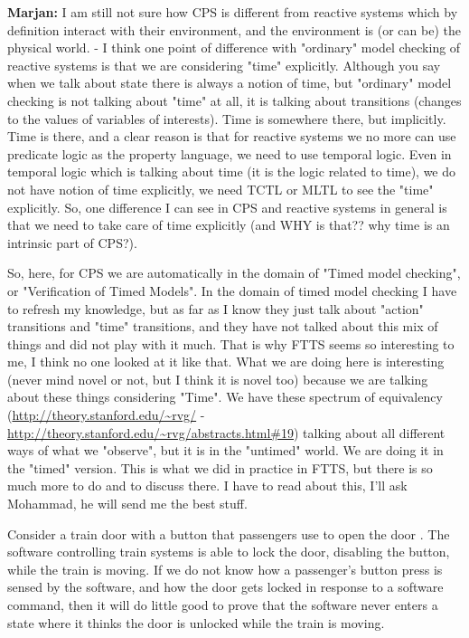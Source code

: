 \documentclass{article}
\newcommand{\MS}[1]{{\color{darkgreen}\textbf{Marjan:} #1}}
\begin{document}
\MS{I am still not sure how CPS is different from reactive systems which by definition interact with their environment, and the environment is (or can be) the physical world. - I think one point of difference with "ordinary" model checking of reactive systems is that we are considering "time" explicitly. Although you say when we talk about state there is always a notion of time, but "ordinary" model checking is not talking about "time" at all, it is talking about transitions (changes to the values of variables of interests). 
Time is somewhere there, but implicitly. Time is there, and a clear reason is that for reactive systems we no more can use predicate logic as the property language, we need to use temporal logic.
Even in temporal logic which is talking about time (it is the logic related to time), we do not have notion of time explicitly, we need TCTL or MLTL to see the "time" explicitly. So, one difference I can see in CPS and reactive systems in general is that we need to take care of time explicitly (and WHY is that?? why time is an intrinsic part of CPS?).

So, here, for CPS we are automatically in the domain of "Timed model checking", or "Verification of Timed Models". In the domain of timed model checking I have to refresh my knowledge, but as far as I know they just talk about "action" transitions and "time" transitions, and they have not talked about this mix of things and did not play with it much. That is why FTTS seems so interesting to me, I think no one looked at it like that. What we are doing here is interesting (never mind novel or not, but I think it is novel too) because we are talking about these things considering "Time". We have these spectrum of equivalency (\url{http://theory.stanford.edu/~rvg/} - \url{http://theory.stanford.edu/~rvg/abstracts.html#19}) talking about all different ways of what we "observe", but it is in the "untimed" world.
We are doing it in the "timed" version. This is what we did in practice in FTTS, but there is so much more to do and to discuss there. I have to read about this, I'll ask Mohammad, he will send me the best stuff.}

Consider a train door with a button that passengers use to open the door \cite{ASYDE-Invited2019Sirjani}.
The software controlling train systems is able to lock the door, disabling the button, while the train is moving.
If we do not know how a passenger's button press is sensed by the software,
and how the door gets locked in response to a software command, then it will do
little good to prove that the software never enters a state where it thinks the door is
unlocked while the train is moving.
\end{document}

